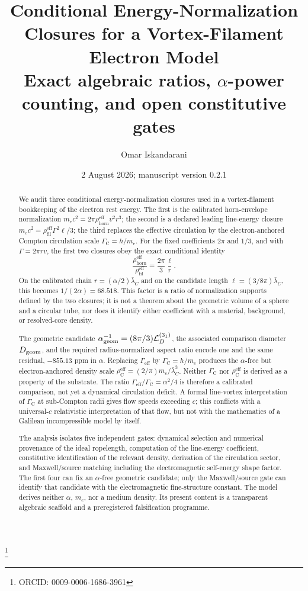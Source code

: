 \documentclass[aps,pre,preprint,notitlepage,nofootinbib,superscriptaddress]{revtex4-2}
\newcommand{\rhohorn}{\rho_{\mathrm{horn}}^{\mathrm{eff}}}
\newcommand{\rhofil}{\rho_{\mathrm{fil}}^{\mathrm{eff}}}
\newcommand{\rhoCeff}{\rho_{\mathrm C}^{\mathrm{eff}}}
\newcommand{\Gammaeff}{\Gamma_{\mathrm{eff}}}
\newcommand{\GammaC}{\Gamma_{\mathrm C}}
\begin{document}
\title{\texorpdfstring{Conditional Energy-Normalization Closures for a Vortex-Filament Electron Model\\\large Exact algebraic ratios, \(\alpha\)-power counting, and open constitutive gates}{Conditional Energy-Normalization Closures for a Vortex-Filament Electron Model}}

\author{Omar Iskandarani}
\thanks{ORCID: 0009-0006-1686-3961}
\date{2 August 2026; manuscript version 0.2.1}

\begin{abstract}
We audit three conditional energy-normalization closures used in a vortex-filament bookkeeping of the electron rest energy.  The first is the calibrated horn-envelope normalization
\(m_ec^2=2\pi\rhohorn v^2r^3\); the second is a declared leading line-energy closure
\(m_ec^2=\rhofil\Gamma^2\ell/3\); the third replaces the effective circulation by the electron-anchored Compton circulation scale \(\GammaC=h/m_e\).
For the fixed coefficients \(2\pi\) and \(1/3\), and with \(\Gamma=2\pi rv\), the first two closures obey the exact conditional identity
\[
\frac{\rhohorn}{\rhofil}
=\frac{2\pi}{3}\frac{\ell}{r}.
\]
On the calibrated chain \(r=(\alpha/2)\bar\lambda_C\) and on the candidate length
\(\ell=(3/8\pi)\bar\lambda_C\), this becomes \(1/(2\alpha)=68.518\).
This factor is a ratio of normalization supports defined by the two closures; it is not a theorem about the geometric volume of a sphere and a circular tube, nor does it identify either coefficient with a material, background, or resolved-core density.

The geometric candidate
\(\alpha_{\rm geom}^{-1}=(8\pi/3)\mathcal L_D^{(3_1)}\), the associated comparison diameter \(D_{\rm geom}\), and the required radius-normalized aspect ratio encode one and the same residual, \(-855.13\) ppm in \(\alpha\).
Replacing \(\Gammaeff\) by \(\GammaC=h/m_e\) produces the \(\alpha\)-free but electron-anchored density scale
\(\rhoCeff=(2/\pi)m_e/\bar\lambda_C^3\).
Neither \(\GammaC\) nor \(\rhoCeff\) is derived as a property of the substrate.
The ratio \(\Gammaeff/\GammaC=\alpha^2/4\) is therefore a calibrated comparison, not yet a dynamical circulation deficit.
A formal line-vortex interpretation of \(\GammaC\) at sub-Compton radii gives flow speeds exceeding \(c\); this conflicts with a universal-\(c\) relativistic interpretation of that flow, but not with the mathematics of a Galilean incompressible model by itself.

The analysis isolates five independent gates: dynamical selection and numerical provenance of the ideal ropelength, computation of the line-energy coefficient, constitutive identification of the relevant density, derivation of the circulation sector, and Maxwell/source matching including the electromagnetic self-energy shape factor.  The first four can fix an \(\alpha\)-free geometric candidate; only the Maxwell/source gate can identify that candidate with the electromagnetic fine-structure constant.
The model derives neither \(\alpha\), \(m_e\), nor a medium density.
Its present content is a transparent algebraic scaffold and a preregistered falsification programme.
\end{abstract}
\end{document}
